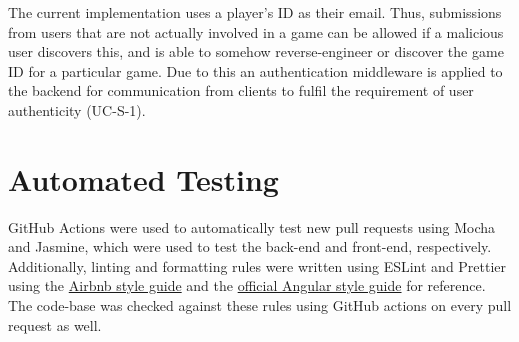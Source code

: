 \documentclass[12pt, titlepage]{article}
\begin{document}
The current implementation uses a player's ID as their email. Thus, submissions from users that are not actually involved in a game can be allowed if a malicious user discovers this, and is able to somehow reverse-engineer or discover the game ID for a particular game. Due to this an authentication middleware is applied to the backend for communication from clients to fulfil the requirement of user authenticity (UC-S-1). 

\section{Automated Testing}\label{sec:auto}

GitHub Actions were used to automatically test new pull requests using Mocha and Jasmine, which were used to test the back-end and front-end, respectively. Additionally, linting and formatting rules were written using ESLint and Prettier using the \href{https://github.com/airbnb/javascript}{Airbnb style guide} and the \href{https://angular.io/guide/styleguide}{official Angular style guide} for reference. The code-base was checked against these rules using GitHub actions on every pull request as well.
\end{document}
